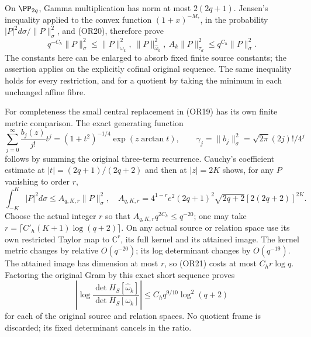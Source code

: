 \documentclass[11pt,a4paper]{article}
\begin{document}
On \(\PP_{2q}\), Gamma multiplication has norm at most \(2(2q+1)\).
Jensen's inequality applied to the convex function
\((1+x)^{-M_*}\), in the probability
\(|P|^2d\sigma/\|P\|_\sigma^2\), and (OR20), therefore prove
\[
 q^{-C_h}\|P\|_\sigma^2\leq
 \|P\|_{\omega_k}^2,\ \|P\|_{\widehat\omega_k}^2,\
 A_k\|P\|_{\tau_d}^2
 \leq q^{C_h}\|P\|_\sigma^2 .                        \tag{OR21}
\]
The constants here can be enlarged to absorb fixed finite source
constants; the assertion applies on the explicitly cofinal original
sequence.  The same inequality holds for every restriction, and
for a quotient by taking the minimum in each unchanged affine
fibre.

For completeness the small central replacement in (OR19) has its
own finite metric comparison.  The exact generating function
\[
 \sum_{j=0}^\infty\frac{b_j(z)}{j!}t^j
 =(1+t^2)^{-1/4}\exp(z\arctan t),\qquad
 \gamma_j=\|b_j\|_\sigma^2=\sqrt{2\pi}(2j)!/4^j
\]
follows by summing the original three-term recurrence.
Cauchy's coefficient estimate at \(|t|=(2q+1)/(2q+2)\)
and then at \(|z|=2K\) shows, for any \(P\) vanishing to order \(r\),
\[
 \int_{-K}^K|P|^2d\sigma
 \leq A_{q,K,r}\|P\|_\sigma^2,\quad
 A_{q,K,r}=4^{1-r}e^2(2q+1)^2\sqrt{2q+2}
                    [2(2q+2)]^{2K}.                \tag{OR22}
\]
Choose the actual integer \(r\) so that
\(A_{q,K,r}q^{2C_h}\leq q^{-20}\); one may take
\(r=\lceil C'_h(K+1)\log(q+2)\rceil\).
On any actual source or relation space use its own restricted
Taylor map to \(\mathbb C^r\), its full kernel and its attained
image.  The kernel metric changes by relative \(O(q^{-20})\);
its log determinant changes by \(O(q^{-19})\).
The attained image has dimension at most \(r\), so (OR21) costs
at most \(C_h r\log q\).  Factoring the original Gram by this
exact short sequence proves
\[
 \left|\log\frac{\det H_S[\widehat\omega_k]}
                        {\det H_S[\omega_k]}\right|
 \leq C_h q^{9/10}\log^2(q+2)                       \tag{OR23}
\]
for each of the original source and relation spaces.
No quotient frame is discarded; its fixed determinant cancels in
the ratio.
\end{document}
